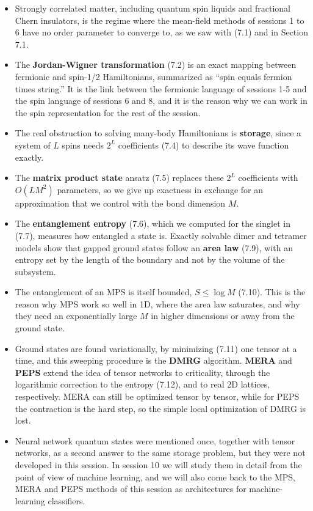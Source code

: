 \begin{itemize}
\item Strongly correlated matter, including quantum spin liquids and fractional Chern insulators, is
  the regime where the mean-field methods of sessions 1 to 6 have no order parameter to converge to,
  as we saw with (7.1) and in Section 7.1.
\item The \textbf{Jordan-Wigner transformation} (7.2) is an exact mapping between fermionic and
  spin-1/2 Hamiltonians, summarized as ``spin equals fermion times string.'' It is the link between
  the fermionic language of sessions 1-5 and the spin language of sessions 6 and 8, and it is the
  reason why we can work in the spin representation for the rest of the session.
\item The real obstruction to solving many-body Hamiltonians is \textbf{storage}, since a system of
  $L$ spins needs $2^L$ coefficients (7.4) to describe its wave function exactly.
\item The \textbf{matrix product state} ansatz (7.5) replaces these $2^L$ coefficients with $O(LM^2)$
  parameters, so we give up exactness in exchange for an approximation that we control with the bond
  dimension $M$.
\item The \textbf{entanglement entropy} (7.6), which we computed for the singlet in (7.7), measures how
  entangled a state is. Exactly solvable dimer and tetramer models show that gapped ground states
  follow an \textbf{area law} (7.9), with an entropy set by the length of the boundary and not by the
  volume of the subsystem.
\item The entanglement of an MPS is itself bounded, $S \le \log M$ (7.10). This is the reason why MPS
  work so well in 1D, where the area law saturates, and why they need an exponentially large $M$ in
  higher dimensions or away from the ground state.
\item Ground states are found variationally, by minimizing (7.11) one tensor at a time, and this
  sweeping procedure is the \textbf{DMRG} algorithm. \textbf{MERA} and \textbf{PEPS} extend the idea
  of tensor networks to criticality, through the logarithmic correction to the entropy (7.12), and to
  real 2D lattices, respectively. MERA can still be optimized tensor by tensor, while for PEPS the
  contraction is the hard step, so the simple local optimization of DMRG is lost.
\item Neural network quantum states were mentioned once, together with tensor networks, as a second
  answer to the same storage problem, but they were not developed in this session. In session 10 we
  will study them in detail from the point of view of machine learning, and we will also come back to
  the MPS, MERA and PEPS methods of this session as architectures for machine-learning classifiers.
\end{itemize}

